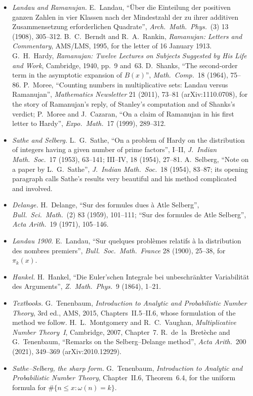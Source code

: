 \begin{itemize}
\item \emph{Landau and Ramanujan.} E.~Landau, ``Über die Einteilung der positiven ganzen Zahlen in vier Klassen nach der Mindestzahl der zu ihrer additiven Zusammensetzung erforderlichen Quadrate'', \emph{Arch.\ Math.\ Phys.}\ (3) 13 (1908), 305--312. B.~C.~Berndt and R.~A.~Rankin, \emph{Ramanujan: Letters and Commentary}, AMS/LMS, 1995, for the letter of 16 January 1913. G.~H.~Hardy, \emph{Ramanujan: Twelve Lectures on Subjects Suggested by His Life and Work}, Cambridge, 1940, pp.~9 and~63. D.~Shanks, ``The second-order term in the asymptotic expansion of $B(x)$'', \emph{Math.\ Comp.}\ 18 (1964), 75--86. P.~Moree, ``Counting numbers in multiplicative sets: Landau versus Ramanujan'', \emph{Mathematics Newsletter} 21 (2011), 73--81 (arXiv:1110.0708), for the story of Ramanujan's reply, of Stanley's computation and of Shanks's verdict; P.~Moree and J.~Cazaran, ``On a claim of Ramanujan in his first letter to Hardy'', \emph{Expo.\ Math.}\ 17 (1999), 289--312.
\item \emph{Sathe and Selberg.} L.~G.~Sathe, ``On a problem of Hardy on the distribution of integers having a given number of prime factors'', I--II, \emph{J.\ Indian Math.\ Soc.}\ 17 (1953), 63--141; III--IV, 18 (1954), 27--81. A.~Selberg, ``Note on a paper by L.~G.~Sathe'', \emph{J.\ Indian Math.\ Soc.}\ 18 (1954), 83--87; its opening paragraph calls Sathe's results very beautiful and his method complicated and involved.
\item \emph{Delange.} H.~Delange, ``Sur des formules dues à Atle Selberg'', \emph{Bull.\ Sci.\ Math.}\ (2) 83 (1959), 101--111; ``Sur des formules de Atle Selberg'', \emph{Acta Arith.}\ 19 (1971), 105--146.
\item \emph{Landau 1900.} E.~Landau, ``Sur quelques problèmes relatifs à la distribution des nombres premiers'', \emph{Bull.\ Soc.\ Math.\ France} 28 (1900), 25--38, for $\pi_k(x)$.
\item \emph{Hankel.} H.~Hankel, ``Die Euler'schen Integrale bei unbeschränkter Variabilität des Arguments'', \emph{Z.\ Math.\ Phys.}\ 9 (1864), 1--21.
\item \emph{Textbooks.} G.~Tenenbaum, \emph{Introduction to Analytic and Probabilistic Number Theory}, 3rd ed., AMS, 2015, Chapters~II.5--II.6, whose formulation of the method we follow. H.~L.~Montgomery and R.~C.~Vaughan, \emph{Multiplicative Number Theory~I}, Cambridge, 2007, Chapter~7. R.~de~la~Bretèche and G.~Tenenbaum, ``Remarks on the Selberg--Delange method'', \emph{Acta Arith.}\ 200 (2021), 349--369 (arXiv:2010.12929).
\item \emph{Sathe--Selberg, the sharp form.} G.~Tenenbaum, \emph{Introduction to Analytic and Probabilistic Number Theory}, Chapter~II.6, Theorem~6.4, for the uniform formula for $\#\{n\le x:\omega(n)=k\}$.
\end{itemize}
